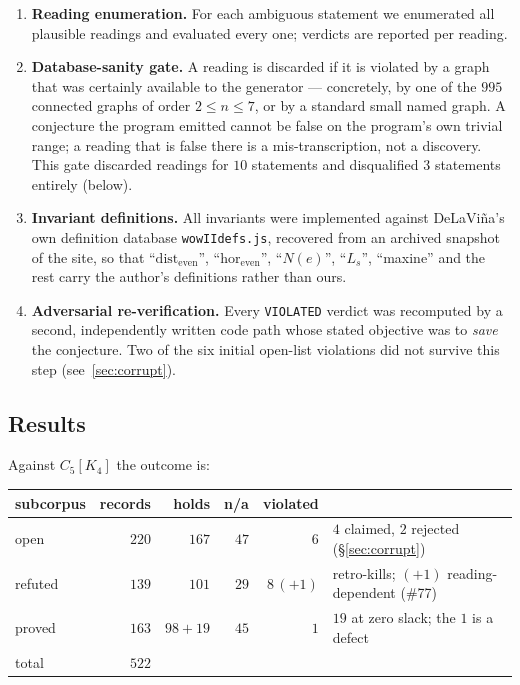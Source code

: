 \documentclass[10pt,a4paper]{article}
\theoremstyle{plain}
\theoremstyle{definition}
\newcommand{\de}{\mathrm{dist_{even}}}
\newcommand{\eh}{\mathrm{hor_{even}}}
\newcommand{\Ls}{L_s}
\newcommand{\blow}[2]{#1[K_{#2}]}
\begin{document}
\begin{enumerate}
\item \textbf{Reading enumeration.} For each ambiguous statement we enumerated all plausible
readings and evaluated every one; verdicts are reported per reading.
\item \textbf{Database-sanity gate.} A reading is discarded if it is violated by a graph that
was certainly available to the generator --- concretely, by one of the $995$ connected graphs of
order $2 \le n \le 7$, or by a standard small named graph. A conjecture the program emitted
cannot be false on the program's own trivial range; a reading that is false there is a
mis-transcription, not a discovery. This gate discarded readings for $10$ statements and
disqualified $3$ statements entirely (below).
\item \textbf{Invariant definitions.} All invariants were implemented against DeLaVi\~na's own
definition database \texttt{wowIIdefs.js}, recovered from an archived snapshot of the site, so
that ``$\de$'', ``$\eh$'', ``$N(e)$'', ``$\Ls$'', ``maxine'' and the rest carry the author's
definitions rather than ours.
\item \textbf{Adversarial re-verification.} Every \texttt{VIOLATED} verdict was recomputed by a
second, independently written code path whose stated objective was to \emph{save} the
conjecture. Two of the six initial open-list violations did not survive this step
(see~\ref{sec:corrupt}).
\end{enumerate}

\subsection{Results}

Against $\blow{C_5}{4}$ the outcome is:

\begin{center}\small
\begin{tabular}{lrrrrl}
\toprule
subcorpus & records & holds & n/a & violated & \\
\midrule
open    & $220$ & $167$      & $47$ & $6$       & $4$ claimed, $2$ rejected (\S\ref{sec:corrupt})\\
refuted & $139$ & $101$      & $29$ & $8\,(+1)$ & retro-kills; $(+1)$ reading-dependent (\#77)\\
proved  & $163$ & $98{+}19$  & $45$ & $1$       & $19$ at zero slack; the $1$ is a defect\\
\midrule
total   & $522$ &            &      &           & \\
\bottomrule
\end{tabular}
\end{center}
\end{document}
